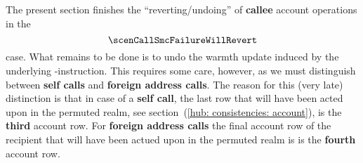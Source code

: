 \begin{center}
\end{center}
The present section finishes the ``reverting/undoing'' of \textbf{callee} account operations in the
\[
	\scenCallSmcFailureWillRevert
\]
case. What remains to be done is to undo the warmth update induced by the underlying -instruction.
This requires some care, however, as we must distinguish between \textbf{self calls} and \textbf{foreign address calls}.
The reason for this (very late) distinction is that in case of a \textbf{self call}, the last row that will have been acted upon in the permuted realm,
see section~(\ref{hub: consistencies: account}),
is the \textbf{third} account row.
For \textbf{foreign address calls} the final account row of the recipient that will have been actued upon in the permuted realm is
is the \textbf{fourth} account row.

